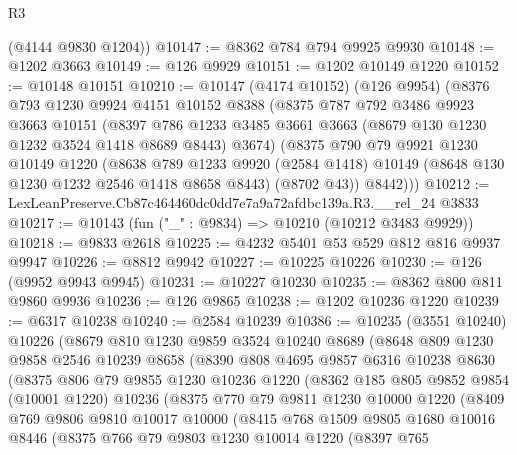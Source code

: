 \begin{lexlean}{R3}
\begin{coremodule}
      (@4144 @9830 @1204))
@10147 := @8362 @784 @794 @9925 @9930
@10148 := @1202 @3663
@10149 := @126 @9929
@10151 := @1202 @10149 @1220
@10152 := @10148 @10151
@10210 := @10147
    (@4174 @10152)
    (@126 @9954)
    (@8376
      @793
      @1230
      @9924
      @4151
      @10152
      @8388
      (@8375
        @787
        @792
        @3486
        @9923
        @3663
        @10151
        (@8397 @786 @1233 @3485 @3661 @3663 (@8679 @130 @1230 @1232 @3524 @1418 @8689 @8443) @3674)
        (@8375
          @790
          @79
          @9921
          @1230
          @10149
          @1220
          (@8638
            @789
            @1233
            @9920
            (@2584 @1418)
            @10149
            (@8648 @130 @1230 @1232 @2546 @1418 @8658 @8443)
            (@8702 @43))
          @8442)))
@10212 := LexLeanPreserve.Cb87c464460dc0dd7e7a9a72afdbc139a.R3.__rel_24 @3833
@10217 := @10143 (fun ("_" : @9834) => @10210 (@10212 @3483 @9929))
@10218 := @9833 @2618
@10225 := @4232 @5401 @53 @529 @812 @816 @9937 @9947
@10226 := @8812 @9942
@10227 := @10225 @10226
@10230 := @126 (@9952 @9943 @9945)
@10231 := @10227 @10230
@10235 := @8362 @800 @811 @9860 @9936
@10236 := @126 @9865
@10238 := @1202 @10236 @1220
@10239 := @6317 @10238
@10240 := @2584 @10239
@10386 := @10235
    (@3551 @10240)
    @10226
    (@8679
      @810
      @1230
      @9859
      @3524
      @10240
      @8689
      (@8648
        @809
        @1230
        @9858
        @2546
        @10239
        @8658
        (@8390
          @808
          @4695
          @9857
          @6316
          @10238
          @8630
          (@8375
            @806
            @79
            @9855
            @1230
            @10236
            @1220
            (@8362
              @185
              @805
              @9852
              @9854
              (@10001 @1220)
              @10236
              (@8375
                @770
                @79
                @9811
                @1230
                @10000
                @1220
                (@8409
                  @769
                  @9806
                  @9810
                  @10017
                  @10000
                  (@8415
                    @768
                    @1509
                    @9805
                    @1680
                    @10016
                    @8446
                    (@8375
                      @766
                      @79
                      @9803
                      @1230
                      @10014
                      @1220
                      (@8397
                        @765

\end{coremodule}
\end{lexlean}
